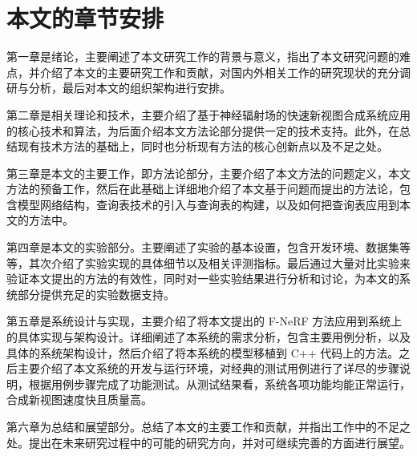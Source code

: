 \section{本文的章节安排}

第一章是绪论，主要阐述了本文研究工作的背景与意义，指出了本文研究问题的难点，并介绍了本文的主要研究工作和贡献，对国内外相关工作的研究现状的充分调研与分析，最后对本文的组织架构进行安排。

第二章是相关理论和技术，主要介绍了基于神经辐射场的快速新视图合成系统应用的核心技术和算法，为后面介绍本文方法论部分提供一定的技术支持。此外，在总结现有技术方法的基础上，同时也分析现有方法的核心创新点以及不足之处。

第三章是本文的主要工作，即方法论部分，主要介绍了本文方法的问题定义，本文方法的预备工作，然后在此基础上详细地介绍了本文基于问题而提出的方法论，包含模型网络结构，查询表技术的引入与查询表的构建，以及如何把查询表应用到本文的方法中。

第四章是本文的实验部分。主要阐述了实验的基本设置，包含开发环境、数据集等等，其次介绍了实验实现的具体细节以及相关评测指标。最后通过大量对比实验来验证本文提出的方法的有效性，同时对一些实验结果进行分析和讨论，为本文的系统部分提供充足的实验数据支持。

第五章是系统设计与实现，主要介绍了将本文提出的 F-NeRF 方法应用到系统上的具体实现与架构设计。详细阐述了本系统的需求分析，包含主要用例分析，以及具体的系统架构设计，然后介绍了将本系统的模型移植到 C++ 代码上的方法。之后主要介绍了本文系统的开发与运行环境，对经典的测试用例进行了详尽的步骤说明，根据用例步骤完成了功能测试。从测试结果看，系统各项功能均能正常运行，合成新视图速度快且质量高。

第六章为总结和展望部分。总结了本文的主要工作和贡献，并指出工作中的不足之处。提出在未来研究过程中的可能的研究方向，并对可继续完善的方面进行展望。


